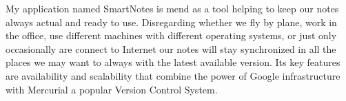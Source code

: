 My application named SmartNotes is mend as a tool helping to keep our notes always actual and ready to use. Disregarding whether we fly by plane, work in the office, use different machines with different operating systems, or just only occasionally are connect to Internet our notes will stay synchronized in all the places we may want to always with the latest available version. Its key features are availability and scalability that combine the power of Google infrastructure with Mercurial a popular Version Control System.